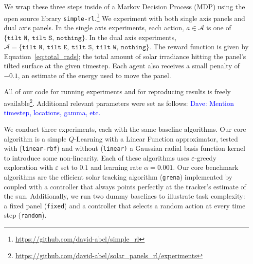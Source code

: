 \documentclass[11pt]{article}
\newcommand{\dnote}[1]{\textcolor{blue}{Dave: #1}}
\newcommand{\mc}{\mathcal}
\begin{document}
We wrap these three steps inside of a Markov Decision Process (MDP) using the open source library \texttt{simple-rl}.\footnote{\url{https://github.com/david-abel/simple_rl}} We experiment with both single axis panels and dual axis panels. In the single axis experiments, each action, $a \in \mc{A}$ is one of $\{\texttt{tilt N},\ \texttt{tilt S},\ \texttt{nothing}\}$. In the dual axis experiments, $\mc{A} = \{\texttt{tilt N},\ \texttt{tilt E},\ \texttt{tilt S},\ \texttt{tilt W},\ \texttt{nothing}\}$. The reward function is given by Equation~\ref{eq:total_rads}; the total amount of solar irradiance hitting the panel's tilted surface at the given timestep. Each agent also receives a small penalty of $-0.1$, an estimate of the energy used to move the panel.

All of our code for running experiments and for reproducing results is freely available\footnote{\url{https://github.com/david-abel/solar_panels_rl/experiments}}. Additional relevant parameters were set as follows: \dnote{Mention timestep, locations, gamma, etc.}

We conduct three experiments, each with the same baseline algorithms. Our core algorithm is a simple $Q$-Learning with a Linear Function approximator, tested with (\texttt{linear-rbf}) and without (\texttt{linear)} a Gaussian radial basis function kernel to introduce some non-linearity. Each of these algorithms uses $\varepsilon$-greedy exploration with $\varepsilon$ set to $0.1$ and learning rate $\alpha = 0.001$. Our core benchmark algorithms are the efficient solar tracking algorithm (\texttt{grena}) implemented by~\citet{Grena2008} coupled with a controller that always points perfectly at the tracker's estimate of the sun. Additionally, we run two dummy baselines to illustrate task complexity: a fixed panel (\texttt{fixed}) and a controller that selects a random action at every time step (\texttt{random}).


\end{document}
